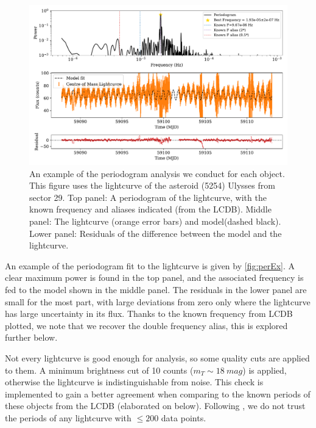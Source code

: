 \documentclass[12pt]{article}
\begin{document}
\begin{figure}[!t]
    \centering
    \includegraphics[width=\textwidth]{PeriodogramUlyssesPaperFigDraft.pdf}
    \caption{An example of the periodogram analysis we conduct for each object.
        This figure uses the lightcurve of the asteroid (5254) Ulysses from sector 29.
        Top panel: A periodogram of the lightcurve, with the known frequency and aliases indicated (from the LCDB).
        Middle panel: The lightcurve (orange error bars) and model(dashed black).
        Lower panel: Residuals of the difference between the model and the lightcurve.}
    \label{fig:perEx}
\end{figure}

An example of the periodogram fit to the lightcurve is given by \autoref{fig:perEx}.
A clear maximum power is found in the top panel, and the associated frequency is fed to the model shown in the middle panel.
The residuals in the lower panel are small for the most part, with large deviations from zero only where the lightcurve has large uncertainty in its flux.
Thanks to the known frequency from LCDB plotted, we note that we recover the double frequency alias, this is explored further below.

Not every lightcurve is good enough for analysis, so some quality cuts are applied to them.
A minimum brightness cut of 10 counts ($m_T \sim \qty{18}{mag}$) %
is applied, otherwise the lightcurve is indistinguishable from noise. %
This check is implemented to gain a better agreement when comparing to the known periods of these objects from the LCDB (elaborated on below).
Following \citeauthor{McNeill2023}, we do not trust the periods of any lightcurve with $\leq 200$ data points.
\end{document}
